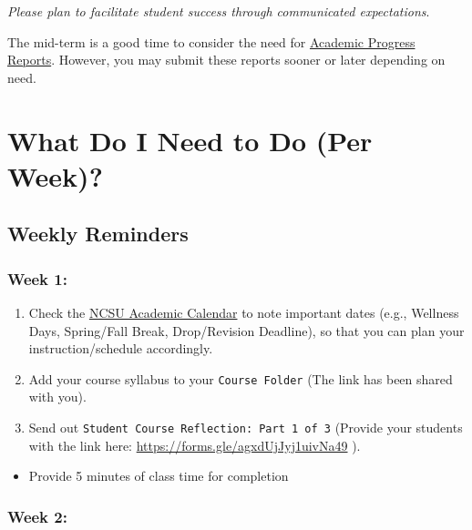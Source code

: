 \documentclass[
]{book}
\providecommand{\tightlist}{%
  \setlength{\itemsep}{0pt}\setlength{\parskip}{0pt}}
\begin{document}
{ \emph{Please plan to facilitate student success through communicated expectations}. }

The mid-term is a good time to consider the need for \href{https://dasa.ncsu.edu/faculty-resources/academic-progress-reporting/}{Academic Progress Reports}. However, you may submit these reports sooner or later depending on need.

\hfill\break

\hypertarget{what-do-i-need-to-do-per-week}{%
\chapter{What Do I Need to Do (Per Week)?}\label{what-do-i-need-to-do-per-week}}

\hypertarget{weekly-reminders}{%
\section{Weekly Reminders}\label{weekly-reminders}}

\hypertarget{week-1}{%
\subsection{Week 1:}\label{week-1}}

\begin{enumerate}
\def\labelenumi{\arabic{enumi})}
\item
  Check the \href{https://studentservices.ncsu.edu/calendars/academic/}{NCSU Academic Calendar} to note important dates (e.g., Wellness Days, Spring/Fall Break, Drop/Revision Deadline), so that you can plan your instruction/schedule accordingly.
\item
  Add your course syllabus to your \texttt{Course\ Folder} (The link has been shared with you).
\item
  Send out \texttt{Student\ Course\ Reflection:\ Part\ 1\ of\ 3} (Provide your students with the link here: \url{https://forms.gle/agxdUjJyj1uivNa49} ).
\end{enumerate}

\begin{itemize}
\tightlist
\item
  Provide 5 minutes of class time for completion
\end{itemize}

\hypertarget{week-2}{%
\subsection{Week 2:}\label{week-2}}
\end{document}
